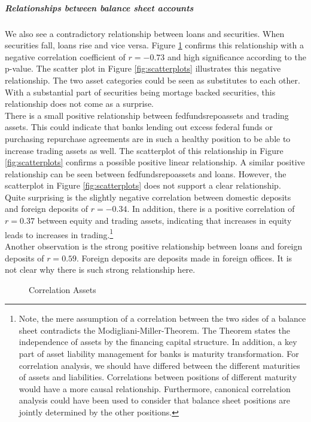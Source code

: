 \documentclass[12pt, a4paper]{article} %
\begin{document}
\subparagraph{Relationships between balance sheet accounts}
We also see a contradictory relationship between loans and securities. When securities fall, loans rise and vice versa. Figure \ref{fig:corr_assets} confirms this relationship with a negative correlation coefficient of $r=-0.73$ and high significance according to the p-value. The scatter plot in Figure \ref{fig:scatterplots} illustrates this negative relationship. The two asset categories could be seen as substitutes to each other. With a substantial part of securities being mortage backed securities, this relationship does not come as a surprise. \\
There is a small positive relationship between fedfundsrepoassets and trading assets. This could indicate that banks lending out excess federal funds or purchasing repurchase agreements are in such a healthy position to be able to increase trading assets as well. The scatterplot of this relationship in Figure \ref{fig:scatterplots} confirms a possible positive linear relationship. A similar positive relationship can be seen between fedfundsrepoassets and loans. However, the scatterplot in Figure \ref{fig:scatterplots} does not support a clear relationship.\\
Quite surprising is the slightly negative correlation between domestic deposits and foreign deposits of $r=-0.34$.
In addition, there is a positive correlation of $r=0.37$ between equity and trading assets, indicating that increases in equity leads to increases in trading.\footnote{Note, the mere assumption of a correlation between the two sides of a balance sheet contradicts the Modigliani-Miller-Theorem. The Theorem states the independence of assets by the financing capital structure. In addition, a key part of asset liability management for banks is maturity transformation. For correlation analysis, we should have differed between the different maturities of assets and liabilities. Correlations between positions of different maturity would have a more causal relationship. Furthermore, canonical correlation analysis could have been used to consider that balance sheet positions are jointly determined by the other positions.}\\
Another observation is the strong positive relationship between loans and foreign deposits of $r=0.59$. Foreign deposits are deposits made in foreign offices. It is not clear why there is such strong relationship here.



\begin{figure}[H]
\begin{minipage}{\textwidth}
\scriptsize
\hskip-2.0cm

\caption[1]{Correlation Assets}
\label{fig:corr_assets}
\end{minipage}
\end{figure}
\end{document}
